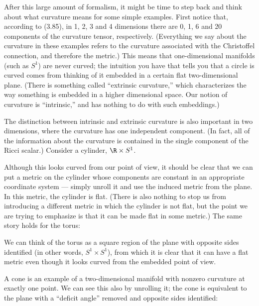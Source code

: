After this large amount of formalism, it might be time to step back
and think about what curvature means for some simple examples.
First notice that, according to (3.85), in 1, 2, 3 and 4 dimensions
there are 0, 1, 6 and 20 components of the curvature tensor,
respectively.  (Everything we say about the curvature in these
examples refers to the curvature associated with the Christoffel
connection, and therefore the metric.)
This means that one-dimensional manifolds (such as $S^1$) are never
curved; the intuition you have that tells you that a circle is
curved comes from thinking of it embedded in a certain flat
two-dimensional plane.  (There is something called ``extrinsic
curvature,'' which characterizes the way something is embedded
in a higher dimensional space.  Our notion of curvature is ``intrinsic,''
and has nothing to do with such embeddings.)

The distinction between intrinsic and extrinsic curvature is also
important in two dimensions, where the curvature has one independent
component.  (In fact, all of the information about the curvature is 
contained in the single component of the Ricci scalar.)  Consider
a cylinder, $\R\times S^1$.
\begin{figure}
  \centerline{
  }
\end{figure}
Although this looks curved from our point of view, it
should be clear that we can put a metric on the cylinder whose
components are constant in an appropriate coordinate system ---
simply unroll it and use the induced metric from the plane.  In this
metric, the cylinder is flat.  (There is also nothing to stop us from
introducing a different metric in which the cylinder is not flat, but
the point we are trying to emphasize is that it can be made flat in
some metric.)  The same story holds for the torus:

\begin{figure}[h]
  \centerline{
  }
\end{figure}

\noindent We can think of the torus as a square region of the plane
with opposite sides identified (in other words, $S^1\times S^1$),
from which it is clear that it can have a flat metric even though
it looks curved from the embedded point of view.

A cone is an example of a two-dimensional manifold with nonzero
curvature at exactly one point.  We can see this also by unrolling
it; the cone is equivalent to the plane with a ``deficit angle''
removed and opposite sides identified:


